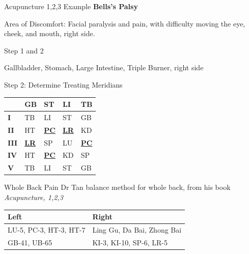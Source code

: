 \begin{frame}{Acupuncture 1,2,3 Example}
  \textbf{\LARGE{Bells's Palsy}}

  Area of Discomfort: Facial paralysis and pain, with difficulty moving the eye, cheek, and mouth, right side.
\end{frame}

\begin{frame}{Step 1 and 2}
  \begin{s1}
    Gallbladder, Stomach, Large Intestine, Triple Burner, right side
  \end{s1}

  Step 2: Determine Treating Meridians

  \begin{table}[]
    \begin{tabular}{@{}lllll@{}}
      \toprule
      & GB                & ST                & LI                & TB                \\ \midrule
      \textbf{I}   & TB                & LI                & ST                & GB                \\
      \textbf{II}  & HT                & {\ul \textbf{PC}} & {\ul \textbf{LR}} & KD                \\
      \textbf{III} & {\ul \textbf{LR}} & SP                & LU                & {\ul \textbf{PC}} \\
      \textbf{IV}  & HT                & {\ul \textbf{PC}} & KD                & SP                \\
      \textbf{V}   & TB                & LI                & ST                & GB                \\ \bottomrule
    \end{tabular}
  \end{table}
\end{frame}

\begin{frame}{Whole Back Pain}
  \Large Dr Tan balance method for whole back, from his book \textit{Acupuncture, 1,2,3}

  \begin{table}[]
    \begin{tabular}{@{}ll@{}}
      \toprule
      Left                   & Right                      \\ \midrule
      LU-5, PC-3, HT-3, HT-7 & Ling Gu, Da Bai, Zhong Bai \\
      GB-41, UB-65           & KI-3, KI-10, SP-6, LR-5    \\ \bottomrule
    \end{tabular}
  \end{table}

\end{frame}
